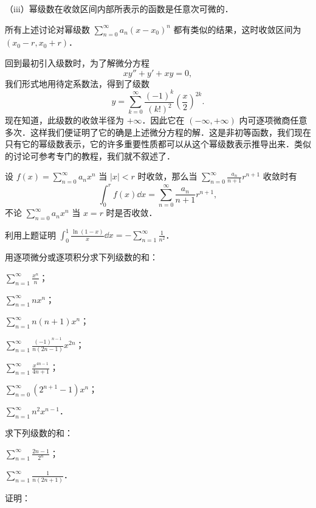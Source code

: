 （iii）幂级数在收敛区间内部所表示的函数是任意次可微的．

所有上述讨论对幂级数 $\displaystyle\sum_{n=0}^{\infty}a_{n}(x-x_{0})^{n}$ 都有类似的结果，这时收敛区间为 $(x_{0}-r,x_{0}+r)$．

回到最初引入级数时，为了解微分方程
\[
xy''+y'+xy=0,
\]
我们形式地用待定系数法，得到了级数
\[
y=\sum_{k=0}^{\infty}\frac{(-1)^{k}}{(k!)^{2}}\left(\frac{x}{2}\right)^{2k}.
\]
现在知道，此级数的收敛半径为 $+\infty$．因此它在 $(-\infty,+\infty)$ 内可逐项微商任意多次．这样我们便证明了它的确是上述微分方程的解．这是非初等函数，我们现在只有它的幂级数表示，它的许多重要性质都可以从这个幂级数表示推导出来．类似的讨论可参考专门的教程，我们就不叙述了．

\begin{xiti}
\item 设 $\displaystyle f(x)=\sum_{n=0}^{\infty}a_{n}x^{n}$ 当 $\left|x\right|<r$ 时收敛，那么当 $\displaystyle\sum_{n=0}^{\infty}\frac{a_{n}}{n+1}r^{n+1}$ 收敛时有
\[
\int_{0}^{r}f(x)\dd x=\sum_{n=0}^{\infty}\frac{a_{n}}{n+1}r^{n+1},
\]
不论 $\displaystyle\sum_{n=0}^{\infty}a_{n}x^{n}$ 当 $x=r$ 时是否收敛．
\item 利用上题证明 $\displaystyle\int_{0}^{1}\frac{\ln(1-x)}{x}\dd x=-\sum_{n=1}^{\infty}\frac{1}{n^{2}}$．
\item 用逐项微分或逐项积分求下列级数的和：
\begin{ziti}
\item $\displaystyle\sum_{n=1}^{\infty}\frac{x^{n}}{n}$；
\item $\displaystyle\sum_{n=1}^{\infty}nx^{n}$；
\item $\displaystyle\sum_{n=1}^{\infty}n(n+1)x^{n}$；
\item $\displaystyle\sum_{n=1}^{\infty}\frac{(-1)^{n-1}}{n(2n-1)}x^{2n}$；
\item $\displaystyle\sum_{n=1}^{\infty}\frac{x^{4n-1}}{4n+1}$；
\item $\displaystyle\sum_{n=0}^{\infty}\left(2^{n+1}-1\right)x^{n}$；
\item $\displaystyle\sum_{n=1}^{\infty}n^{2}x^{n-1}$．
\end{ziti}
\item 求下列级数的和：
\begin{ziti}
\item $\displaystyle\sum_{n=1}^{\infty}\frac{2n-1}{2^{n}}$；
\item $\displaystyle\sum_{n=1}^{\infty}\frac{1}{n(2n+1)}$．
\end{ziti}
\item 证明：

\end{xiti}

